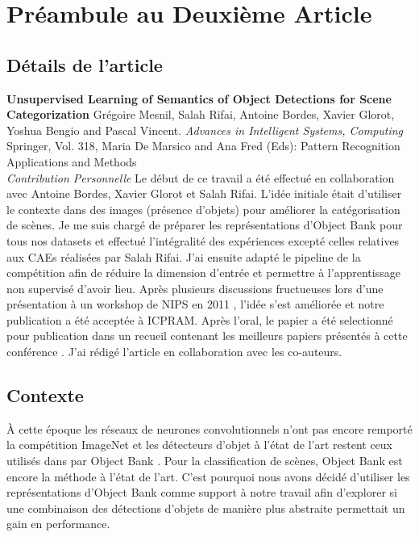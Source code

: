 \chapter{Pr\'{e}ambule au Deuxi\`{e}me Article }

\section{D\'{e}tails de l'article}

{ \bf Unsupervised Learning of Semantics of Object Detections for Scene
Categorization} Gr\'{e}goire Mesnil, Salah Rifai, Antoine Bordes, Xavier
Glorot, Yoshua Bengio and Pascal Vincent.  { \it Advances in Intelligent
Systems, Computing} Springer, Vol.  318, Maria De Marsico and Ana Fred (Eds):
Pattern Recognition Applications and Methods\\ 

{\it Contribution Personnelle} Le d\'{e}but de ce travail a \'{e}t\'{e}
effectu\'{e} en collaboration avec Antoine Bordes, Xavier Glorot et Salah
Rifai. L'id\'{e}e initiale \'{e}tait d'utiliser le contexte dans des images
(pr\'{e}sence d'objets) pour am\'{e}liorer la cat\'{e}gorisation de sc\`{e}nes.
Je me suis charg\'{e} de pr\'{e}parer les repr\'{e}sentations d'Object Bank
pour tous nos datasets et effectu\'{e} l'int\'{e}gralit\'{e} des
exp\'{e}riences except\'{e} celles relatives aux CAEs r\'{e}alis\'{e}es par
Salah Rifai. J'ai ensuite adapt\'{e} le pipeline de la comp\'{e}tition afin de
r\'{e}duire la dimension d'entr\'{e}e et permettre \`{a} l'apprentissage non
supervis\'{e} d'avoir lieu.  Apr\`{e}s plusieurs discussions fructueuses lors
d'une pr\'{e}sentation \`{a} un workshop de NIPS en 2011
\citep{Mesnil-workshop-nips}, l'id\'{e}e s'est am\'{e}lior\'{e}e et notre
publication \citep{Mesnil-icpram} a \'{e}t\'{e} accept\'{e}e \`{a} ICPRAM.
Apr\`{e}s l'oral, le papier a \'{e}t\'{e} selectionn\'{e} pour publication dans
un recueil contenant les meilleurs papiers pr\'{e}sent\'{e}s \`{a} cette
conf\'{e}rence \citep{Mesnil-icpram-journal}. J'ai r\'{e}dig\'{e} l'article en
collaboration avec les co-auteurs.

\section{Contexte}

\`{A} cette \'{e}poque les r\'{e}seaux de neurones convolutionnels n'ont pas
encore remport\'{e} la comp\'{e}tition ImageNet \citep{Krizhevsky-2012-small} et les
d\'{e}tecteurs d'objet \`{a} l'\'{e}tat de l'art restent ceux utilisés dans par
Object Bank \citep{lsvm-pami}. Pour la classification de sc\`{e}nes, Object
Bank est encore la m\'{e}thode \`{a} l'\'{e}tat de l'art.  C'est pourquoi nous
avons d\'{e}cid\'{e} d'utiliser les repr\'{e}sentations d'Object Bank comme
support \`{a} notre travail afin d'explorer si une combinaison des
d\'{e}tections d'objets de mani\`{e}re plus abstraite permettait un gain en
performance.

